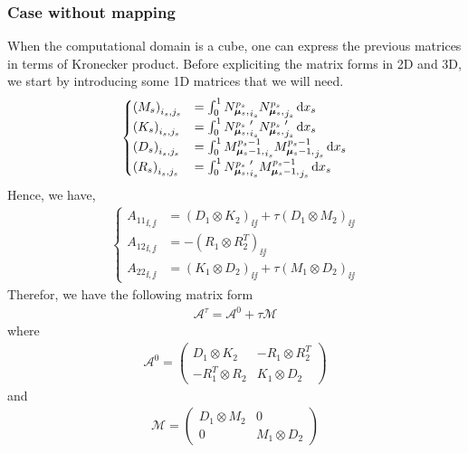 \subsubsection*{Case without mapping}
When the computational domain is a cube, one can express the previous matrices in terms of Kronecker product.
Before expliciting the matrix forms in 2D and 3D, we start by introducing some 1D matrices that we will need.
\begin{align}
  \begin{cases}
    \left( M_{s} \right)_{i_s, j_s} &= \int_{0}^1 {N_{\boldsymbol{\mu}_s,}^{p_s}}_{i_s} {N_{\boldsymbol{\mu}_s,}^{p_s}}_{j_s} \,{\rm d} x_s
    \\
    \left( K_{s} \right)_{i_s, j_s} &= \int_{0}^1 {N_{\boldsymbol{\mu}_s,}^{p_s}}_{i_s}^\prime {N_{\boldsymbol{\mu}_s,}^{p_s}}_{j_s}^\prime \,{\rm d} x_s
    \\
    \left( D_{s} \right)_{i_s, j_s} &= \int_{0}^1 {M_{\boldsymbol{\mu}_s-1,}^{p_s-1}}_{i_s} {M_{\boldsymbol{\mu}_s-1,}^{p_s-1}}_{j_s} \,{\rm d} x_s
    \\
    \left( R_{s} \right)_{i_s, j_s} &= \int_{0}^1 {N_{\boldsymbol{\mu}_s,}^{p_s}}_{i_s}^\prime {M_{\boldsymbol{\mu}_s-1,}^{p_s-1}}_{j_s} \,{\rm d} x_s
  \end{cases}
\end{align}
Hence, we have,
\begin{align*}
  \begin{cases}
    {A_{11}}_{\ii, \jj} &= \left( D_1 \otimes K_2 \right)_{\ii \jj} 
                         + \tau \left( D_1 \otimes M_2 \right)_{\ii \jj} 
    \\
    {A_{12}}_{\ii, \jj} &= - \left( R_1 \otimes R_2^T \right)_{\ii \jj} 
    \\
    {A_{22}}_{\ii, \jj} &= \left( K_1 \otimes D_2 \right)_{\ii \jj} 
                         + \tau \left( M_1 \otimes D_2 \right)_{\ii \jj} 
  \end{cases}
\end{align*}
Therefor, we have the following matrix form 
\begin{align}
  \mathcal{A}^\tau = \mathcal{A}^0 + \tau \mathcal{M}
\end{align}
where
\begin{align}
  \mathcal{A}^0 = 
  \begin{pmatrix}
        D_1 \otimes K_2  & - R_1 \otimes R_2^T  \\
    - R_1^T \otimes R_2  &   K_1 \otimes D_2 
  \end{pmatrix}
  \label{eq:matrix-A0-2d}
\end{align}
and
\begin{align}
  \mathcal{M} = 
  \begin{pmatrix}
    D_1 \otimes M_2   & 0  \\
    0 & M_1 \otimes D_2   
  \end{pmatrix}
  \label{eq:matrix-M-2d}
\end{align}

